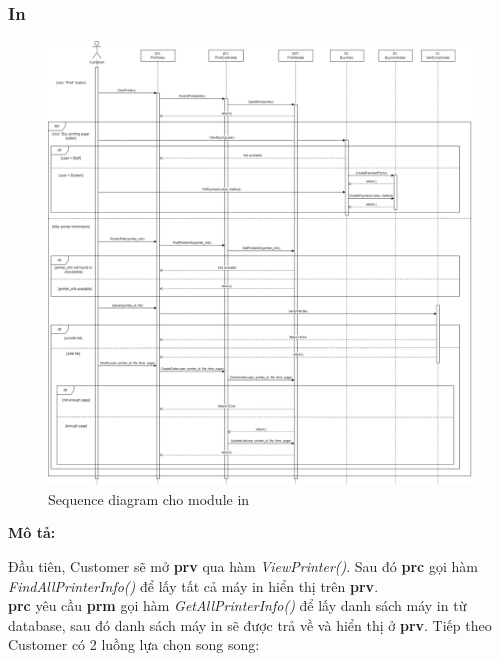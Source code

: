 \subsubsection{In}
\begin{figure}[H]
    \begin{center}
        \includegraphics[width=1\textwidth]{Images/System Modelling/Printing_Sequence.png}
        \caption{Sequence diagram cho module in}
    \end{center}
\end{figure}
\textbf{Mô tả: }\par
Đầu tiên, Customer sẽ mở \textbf{prv} qua hàm \textit{ViewPrinter()}. Sau đó \textbf{prc} gọi hàm \textit{FindAllPrinterInfo()} để lấy tất cả máy in hiển thị trên \textbf{prv}. \\
\textbf{prc} yêu cầu \textbf{prm} gọi hàm \textit{GetAllPrinterInfo()} để lấy danh sách máy in từ database, sau đó danh sách máy in sẽ được trả về và hiển thị ở \textbf{prv}.
Tiếp theo Customer có 2 luồng lựa chọn song song:
